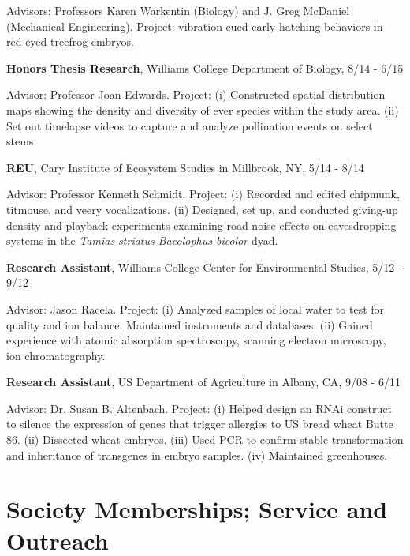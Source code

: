 \documentclass[margin,line]{res}
\begin{document}
\begin{resume}
\vspace{-.43cm}
{Advisors: Professors Karen Warkentin (Biology) and J. Greg McDaniel (Mechanical Engineering). Project: vibration-cued early-hatching behaviors in red-eyed treefrog embryos. }

\vspace{-.1cm}
{\bf Honors Thesis Research},  Williams College Department of Biology, 8/14 - 6/15 

\vspace{-.43cm}
{Advisor: Professor Joan Edwards. Project: (i) Constructed spatial distribution maps showing the density and diversity of ever species within the study area. (ii) Set out timelapse videos to capture and analyze pollination events on select stems.} 

\vspace{-.1cm}
{\bf REU},  Cary Institute of Ecosystem Studies in Millbrook, NY, 5/14 - 8/14

\vspace{-.43cm}
{Advisor: Professor Kenneth Schmidt. Project: (i) Recorded and edited chipmunk, titmouse, and veery vocalizations. (ii) Designed, set up, and conducted giving-up density and playback experiments examining road noise effects on eavesdropping systems in the {\it Tamias striatus-Baeolophus bicolor} dyad.}

\vspace{-.1cm}
{\bf Research Assistant},  Williams College Center for Environmental Studies, 5/12 - 9/12

\vspace{-.43cm}
{Advisor: Jason Racela. Project: (i) Analyzed samples of local water to test for quality and ion balance. Maintained instruments and databases. (ii) Gained experience with atomic absorption spectroscopy, scanning electron microscopy, ion chromatography.}

\vspace{-.1cm}
{\bf Research Assistant},  US Department of Agriculture in Albany, CA, 9/08 - 6/11

\vspace{-.43cm}
{Advisor: Dr. Susan B. Altenbach. Project: (i) Helped design an RNAi construct to silence the expression of genes that trigger allergies to US bread wheat Butte 86. (ii) Dissected wheat embryos. (iii) Used PCR to confirm stable transformation and inheritance of transgenes in embryo samples. (iv) Maintained greenhouses.}

\section{\sc Society Memberships; Service and Outreach}


\end{resume}
\end{document}
